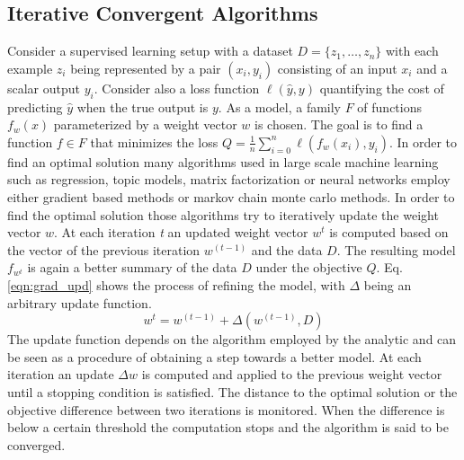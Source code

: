 \subsection{Iterative Convergent Algorithms}
\label{ss:ica}
Consider a supervised learning setup with a dataset $\textit{D} = \{z_1,\ldots,z_n\}$ with each example $z_i$ being represented by a pair $(x_i,y_i)$ consisting of an input $x_i$ and a scalar output $y_i$.
Consider also a loss function $\ell(\hat{y},y)$ quantifying the cost of predicting $\hat{y}$ when the true output is $y$. As a model, a family $F$ of functions $f_w(x)$ parameterized by a weight vector $w$ is chosen.
The goal is to find a function $f \in F$ that minimizes the loss $Q = \frac{1}{n}\sum_{i=0}^{n} \ell(f_w(x_i),y_i)$.
In order to find an optimal solution many algorithms used in large scale machine learning such as regression, topic models, matrix factorization or neural networks employ either gradient based methods or markov chain monte carlo methods.
In order to find the optimal solution those algorithms try to iteratively update the weight vector $w$. At each iteration \textit{t} an updated weight vector $w^{t}$ is computed based on the vector of the previous iteration $w^{(t-1)}$ and the data $D$. The resulting model $f_{w^{t}}$ is again a better summary of the data $D$ under the objective $Q$. Eq. \ref{eqn:grad_upd} shows the process of refining the model, with $\Delta$ being an arbitrary update function.
\begin{equation}
w^{t} = w^{(t-1)} + \Delta(w^{(t-1)},D)
\label{eqn:grad_upd}
\end{equation}
The update function depends on the algorithm employed by the analytic and can be seen as a procedure of obtaining a step towards a better model. At each iteration an update $\Delta w$ is computed and applied to the previous weight vector until a stopping condition is satisfied. The distance to the optimal solution or the objective difference between two iterations is monitored. When the difference is below a certain threshold the computation stops and the algorithm is said to be converged.

